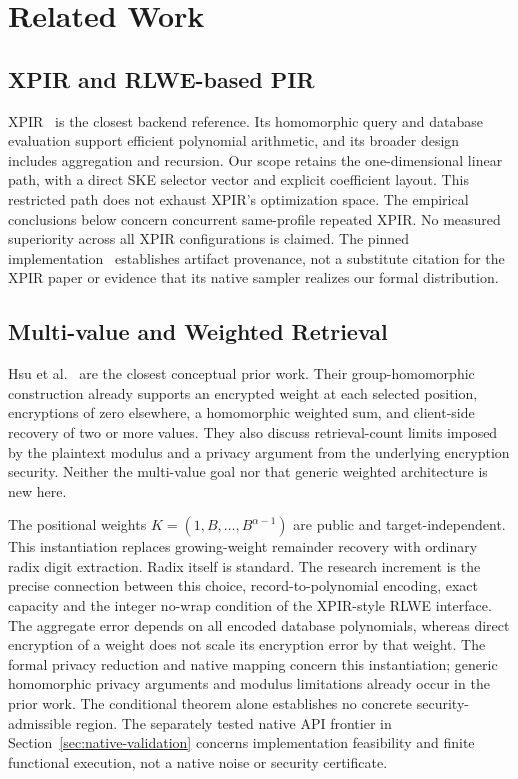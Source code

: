 \section{Related Work}
\label{sec:related-work}

\subsection{XPIR and RLWE-based PIR}
XPIR~\cite{melchor2016xpir} is the closest backend reference. Its
homomorphic query and database evaluation support efficient polynomial
arithmetic, and its broader design includes aggregation and recursion.
Our scope retains the one-dimensional linear path, with a direct SKE
selector vector and explicit coefficient layout. This restricted path
does not exhaust XPIR's optimization space. The empirical conclusions below
concern concurrent same-profile repeated XPIR. No measured superiority
across all XPIR configurations is claimed. The pinned implementation~\cite{xpir_github} establishes
artifact provenance, not a substitute citation for the XPIR paper or
evidence that its native sampler realizes our formal distribution.

\subsection{Multi-value and Weighted Retrieval}
Hsu et al.~\cite[Secs.~III--V]{mulityquery} are the closest conceptual
prior work. Their group-homomorphic construction already supports an
encrypted weight at each selected position, encryptions of zero elsewhere,
a homomorphic weighted sum, and client-side recovery of two or more
values. They also discuss retrieval-count limits imposed by the plaintext
modulus and a privacy argument from the underlying encryption security.
Neither the multi-value goal nor that generic weighted architecture is
new here.

The positional weights \(K=(1,B,\ldots,B^{\alpha-1})\) are public and
target-independent. This instantiation replaces growing-weight
remainder recovery with ordinary radix digit extraction. Radix itself is
standard. The research increment is the precise connection between this
choice, record-to-polynomial encoding, exact capacity and the integer
no-wrap condition of the XPIR-style RLWE interface. The aggregate error
depends on all encoded database polynomials, whereas direct encryption of
a weight does not scale its encryption error by that weight. The formal
privacy reduction and native mapping concern this instantiation; generic
homomorphic privacy arguments and modulus limitations already occur in
the prior work. The conditional theorem alone establishes no concrete
security-admissible region. The separately tested native API frontier in
Section~\ref{sec:native-validation} concerns implementation feasibility and
finite functional execution, not a native noise or security certificate.

